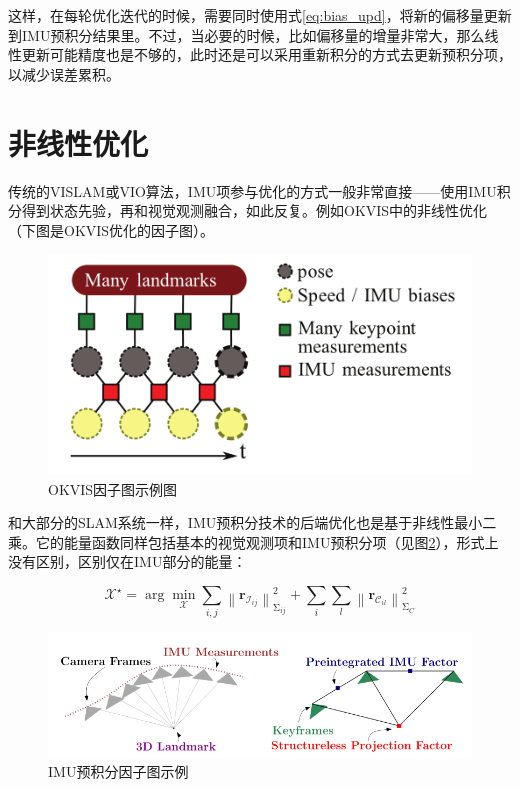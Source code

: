 这样，在每轮优化迭代的时候，需要同时使用式\eqref{eq:bias_upd}，将新的偏移量更新到IMU预积分结果里。不过，当必要的时候，比如偏移量的增量非常大，那么线性更新可能精度也是不够的，此时还是可以采用重新积分的方式去更新预积分项，以减少误差累积。

\section{非线性优化}

传统的VISLAM或VIO算法，IMU项参与优化的方式一般非常直接——使用IMU积分得到状态先验，再和视觉观测融合，如此反复。例如OKVIS中的非线性优化（下图是OKVIS优化的因子图）。

\begin{figure}[htb!]
    \centering
    \includegraphics[width=.6\textwidth]{./figs/okvis.png}
    \caption{OKVIS因子图示例图\citep{leutenegger2015keyframe}}
    \label{fig:okvis}
\end{figure}

和大部分的SLAM系统一样，IMU预积分技术的后端优化也是基于非线性最小二乘。它的能量函数同样包括基本的视觉观测项和IMU预积分项（见图\ref{fig:preint}），形式上没有区别，区别仅在IMU部分的能量：

\begin{equation}\label{eq:gtsam_res}
    \bm{\mathcal X}^\star =
        \arg\mathop{\min}_{\bm{\mathcal X}}
        \sum_{i,j}\left\| \bm{r}_{\mathcal{I}_{ij}} \right\|^2_{\mathrm\Sigma_{ij}} +
        \sum_{i} \sum_{l} \left\| \bm{r}_{\mathcal{C}_{il}} \right\|^2_{\mathrm\Sigma_{C}}
\end{equation}

\begin{figure}[htb!]
    \centering
    \includegraphics[width=.8\textwidth]{./figs/preint.png}
    \caption{IMU预积分因子图示例\citep{forster2017manifold}}
    \label{fig:preint}
\end{figure}

